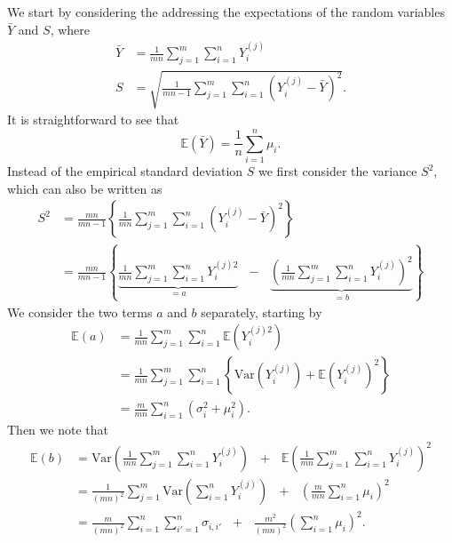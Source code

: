 \documentclass{article}
\newcommand{\sd}{s}
\newcommand{\mean}{\bar{Y}}
\begin{document}
We start by considering the addressing the expectations of the random variables $\mean$ and $S$, where
\begin{align*}
\mean & = \frac{1}{mn} \sum_{j = 1}^m \sum_{i = 1}^n Y_i^{(j)}\\
S & = \sqrt{\frac{1}{mn - 1} \sum_{j = 1}^m \sum_{i = 1}^n \left(Y_i^{(j)} - \mean\right)^2}.
\end{align*}
It is straightforward to see that 
\begin{equation}
\mathbb{E}(\mean) = \frac{1}{n} \sum_{i = 1}^n \mu_i.
\end{equation}
Instead of the empirical standard deviation $S$ we first consider the variance $S^2$, which can also be written as
\begin{align}
S^2 & = \frac{mn}{mn - 1} \left\{\frac{1}{mn} \sum_{j = 1}^m \sum_{i = 1}^n \left(Y_i^{(j)} - \mean\right)^2 \right\}\\
& = \frac{mn}{mn - 1} \left\{ \underbrace{\frac{1}{mn} \sum_{j = 1}^m \sum_{i = 1}^n Y_i^{(j)2}}_{= a} \ \ \ - \ \ \ \underbrace{\left(\frac{1}{mn} \sum_{j = 1}^m \sum_{i = 1}^n Y_i^{(j)} \right)^2}_{= b} \right\} \label{eq:sigma2hat}
\end{align}
We consider the two terms $a$ and $b$ separately, starting by
\begin{align*}
\mathbb{E}(a) & = \frac{1}{mn} \sum_{j = 1}^m \sum_{i = 1}^n \mathbb{E}\left(Y_i^{(j)2}\right)\\
& = \frac{1}{mn} \sum_{j = 1}^m \sum_{i = 1}^n \left\{ \text{Var}\left(Y_i^{(j)}\right) + \mathbb{E}\left(Y_i^{(j)}\right)^2 \right\}\\
& = \frac{m}{mn} \sum_{i = 1}^n (\sigma_{i}^2 + \mu_i^2).
\end{align*}
Then we note that
\begin{align*}
\mathbb{E}(b) & = \text{Var}\left( \frac{1}{mn} \sum_{j = 1}^m \sum_{i = 1}^n Y_i^{(j)} \right) \ \ \ + \ \ \ \mathbb{E}\left(\frac{1}{mn}  \sum_{j = 1}^m \sum_{i = 1}^n Y_i^{(j)} \right)^2\\
& = \frac{1}{(mn)^2}\sum_{j = 1}^m \text{Var}\left(\sum_{i = 1}^n Y_i^{(j)} \right) \ \ \ + \ \ \ \left(\frac{m}{mn} \sum_{i = 1}^n \mu_i\right)^2\\
& = \frac{m}{(mn)^2} \sum_{i = 1}^n \sum_{i' = 1}^n \sigma_{i,i'} \ \ \ + \ \ \ \frac{m^2}{(mn)^2}\left(\sum_{i = 1}^n \mu_i\right)^2.
\end{align*}
\end{document}
